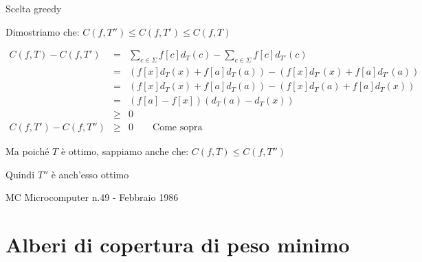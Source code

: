 \begin{frame}[shrink=10]{Scelta greedy}

\BIL
\item Dimostriamo che: $C(f,T'') \leq C(f, T') \leq C(f,T)$

\begin{eqnarray*}
C(f,T) - C(f,T') &=& \sum_{c \in \Sigma} f[c]d_T(c) - \sum_{c \in \Sigma} f[c]d_{T'}(c) \\
             &=& (f[x]d_T(x)+f[a]d_T(a)) - (f[x]d_{T'}(x)+f[a]d_{T'}(a)) \\
             &=& (f[x]d_T(x)+f[a]d_T(a)) - (f[x]d_{T}(a)+f[a]d_{T}(x)) \\
             &=& (f[a]-f[x])(d_T(a)-d_T(x)) \\
             &\geq& 0 \\
C(f,T') - C(f,T'') &\geq& 0 \qquad \textrm{Come sopra}
\end{eqnarray*}

\item Ma poiché $T$ è ottimo, sappiamo anche che: $C(f,T) \leq C(f,T'')$
\item Quindi $T''$ è anch'esso ottimo
\EIL

\end{frame}

\begin{OnlySlides}{MC Microcomputer n.49 - Febbraio 1986}


\end{OnlySlides}

\section{Alberi di copertura di peso minimo}

